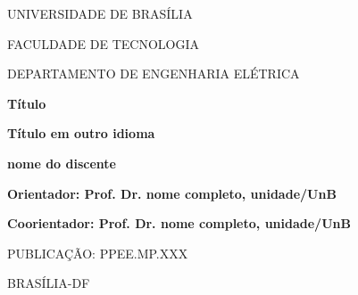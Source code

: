 \documentclass[11pt,a4paper,openright,titlepage,oneside]{book}
\begin{document}



\setcounter{secnumdepth}{3} %
\setcounter{tocdepth}{2} %
\pagestyle{plain} 




\capaprincipal
\begin{center}
UNIVERSIDADE DE BRASÍLIA

FACULDADE DE TECNOLOGIA

DEPARTAMENTO DE ENGENHARIA ELÉTRICA
\end{center}

\vspace{3cm}


\begin{center}

\textbf{Título}
\end{center}

\vspace{2cm}

\begin{center}

\textbf{Título em outro idioma}

\end{center}

\vspace{3cm}

\begin{center}

\textbf{nome do discente}

\vspace{2cm}

\textbf{Orientador: Prof. Dr. nome completo, unidade/UnB}

\textbf{Coorientador: Prof. Dr. nome completo, unidade/UnB}

\end{center}

\vspace{2cm}

PUBLICAÇÃO: PPEE.MP.XXX

BRASÍLIA-DF


\capaassinaturas

\setcounter{page}{2}

\fichacatalografica
\end{document}
